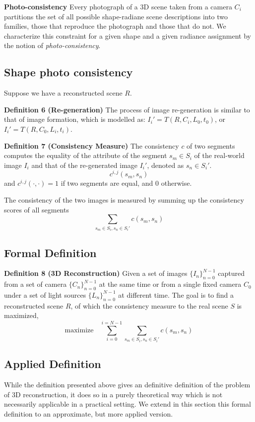 \textbf{Photo-consistency} Every photograph of a 3D scene taken from a camera $C_i$ partitions the set of all possible shape-radiane scene descriptions into two families, those that reproduce the photograph and those that do not. We characterize this constraint for a given shape and a given radiance assignment by the notion of \textit{photo-consistency}.

\subsection{Shape photo consistency}
Suppose we have a reconstructed scene $R$.

\textbf{Definition 6 (Re-generation)} The process of image re-generation is similar to that of image formation, which is modelled as: $I_i' = T(R, C_i, L_0, t_0)$, or $I_i' = T(R, C_0, L_i, t_i)$.

\textbf{Definition 7 (Consistency Measure)} The consistency $\mathit{c}$ of two segments computes the equality of the attribute of the segment $s_m \in S_i$ of the real-world image $I_i$ and that of the re-generated image $I_i'$, denoted as $s_n\in S_i'$. \ie
$$\mathit{c}^{i,j}(s_m, s_n)$$
and $\mathit{c}^{i,j}(\cdot, \cdot)=1$ if two segments are equal, and 0 otherwise.

The consistency of the two images is measured by summing up the consistency scores of all segments
$$\sum_{s_m\in S_i, s_n\in S_i'}\mathit{c}(s_m, s_n)$$

\subsection{Formal Definition}
\textbf{Definition 8 (3D Reconstruction)} Given a set of images $\{I_n\}_{n=0}^{N-1}$
captured from a set of camera $\{C_n\}_{n=0}^{N-1}$ at the same time or from a single fixed camera $C_0$ under a set of light sources $\{L_n\}_{n=0}^{N-1}$ at different time. The goal is to find a reconstructed scene $R$, of which the consistency measure to the real scene $S$ is maximized, \ie
$$\mbox{maximize}\quad \sum_{i=0}^{i=N-1}\sum_{s_m\in S_i, s_n\in S_i'}\mathit{c}(s_m, s_n)$$

\subsection{Applied Definition}
While the definition presented above gives an definitive definition of the problem of 3D reconstruction, it does so in a purely theoretical way which is not necessarily applicable in a practical setting. We extend in this section this formal definition to an approximate, but more applied version.

